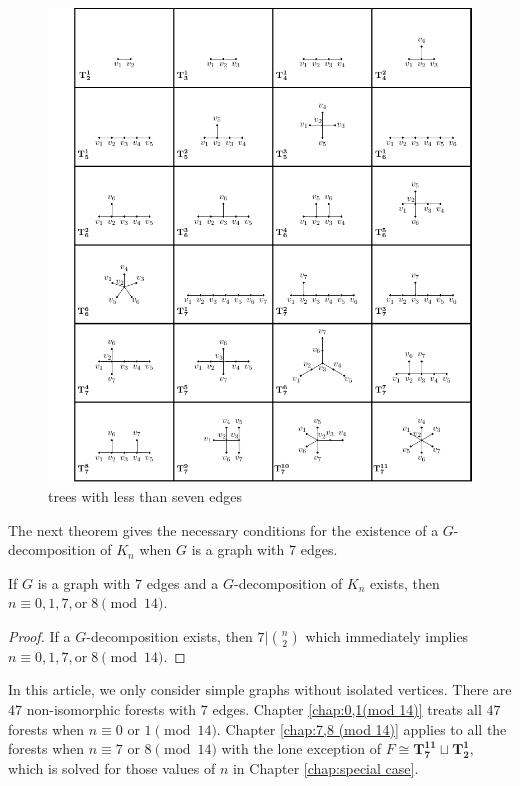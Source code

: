 \begin{figure}[H]
\begin{center}
\includegraphics{standalone/tree chart.pdf}
\end{center}
\caption{trees with less than seven edges}
\label{fig:catalog}
\end{figure}

The next theorem gives the necessary conditions for the existence of a $G$-decomposition of $K_n$ when $G$ is a graph with 7 edges.

\begin{thm}

  If $G$ is a graph with $7$ edges and a $G$-decomposition of $K_n$ exists, then $n \equiv 0,1,7, \textrm{or} \; 8 \pmod{14}.$

\end{thm}

\begin{proof}

    If a $G$-decomposition exists, then $7|\binom{n}{2}$ which immediately implies $n \equiv 0,1,7, \textrm{or} \; 8 \pmod{14}.$

\end{proof}

In this article, we only consider simple graphs without isolated vertices. There are $47$ non-isomorphic forests with $7$ edges. Chapter \ref{chap:0,1(mod 14)} treats all $47$ forests when $n \equiv 0 \textrm{ or } 1 \pmod{14}$. Chapter \ref{chap:7,8 (mod 14)} applies to all the forests when $n \equiv 7 \textrm{ or } 8 \pmod{14}$ with the lone exception of $F \cong \mathbf{T_{7}^{11}}\sqcup\mathbf{T_{2}^{1}},$ which is solved for those values of $n$ in Chapter \ref{chap:special case}. 

